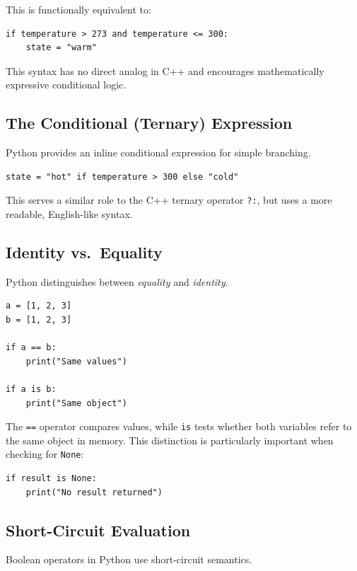 This is functionally equivalent to:

\begin{verbatim}
if temperature > 273 and temperature <= 300:
    state = "warm"
\end{verbatim}

This syntax has no direct analog in C++ and encourages mathematically expressive conditional logic.

\subsection{The Conditional (Ternary) Expression}

Python provides an inline conditional expression for simple branching.

\begin{verbatim}
state = "hot" if temperature > 300 else "cold"
\end{verbatim}

This serves a similar role to the C++ ternary operator \texttt{?:}, but uses a more readable, English-like syntax.

\subsection{Identity vs.\ Equality}

Python distinguishes between \emph{equality} and \emph{identity}.

\begin{verbatim}
a = [1, 2, 3]
b = [1, 2, 3]

if a == b:
    print("Same values")

if a is b:
    print("Same object")
\end{verbatim}

The \texttt{==} operator compares values, while \texttt{is} tests whether both variables refer to the same object in memory. This distinction is particularly important when checking for \texttt{None}:

\begin{verbatim}
if result is None:
    print("No result returned")
\end{verbatim}

\subsection{Short-Circuit Evaluation}

Boolean operators in Python use short-circuit semantics.

